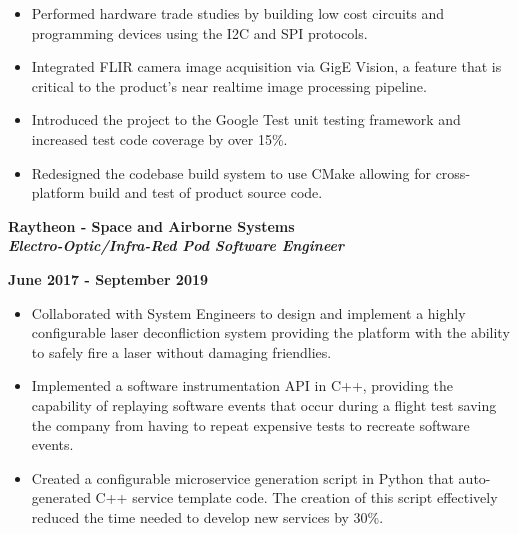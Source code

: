 \documentclass[10pt,letterpaper]{article}
\begin{document}
\begin{itemize}[noitemsep,topsep=0pt]
    \setlength\itemsep{0.1em}
    \item Performed hardware trade studies by building low cost circuits
          and programming devices using the I2C and SPI protocols.
    \item Integrated FLIR camera image acquisition via GigE Vision, a feature
          that is  critical to the product's near realtime image processing
          pipeline.
    \item Introduced the project to the Google Test unit testing framework and
          increased test code coverage by over 15\%.
    \item Redesigned the codebase build system to use CMake allowing for
          cross-platform build and test of product source code.
\end{itemize}

\medskip

\begin{minipage}[t]{0.53\textwidth}
    \begin{flushleft}
        \textbf{Raytheon - Space and Airborne Systems}\\
        \textbf{\textit{Electro-Optic/Infra-Red Pod Software Engineer}}\\
    \end{flushleft}
\end{minipage}
\begin{minipage}[t]{0.44\textwidth}
    \begin{flushright}
        \textbf{June 2017 - September 2019}
    \end{flushright}
\end{minipage}

\begin{itemize}[noitemsep,topsep=0pt]
    \setlength\itemsep{0.1em}
    \item Collaborated with System Engineers to design and implement a highly
          configurable laser deconfliction system providing the platform with
          the ability to safely fire a laser without damaging friendlies.
    \item Implemented a software instrumentation API in C++, providing the
          capability of replaying software events that occur during a flight
          test saving the company from having to repeat expensive tests to
          recreate software events.
    \item Created a configurable microservice generation script in Python that
          auto-generated C++ service template code. The creation of this script
          effectively reduced the time needed to develop new services by 30\%.
\end{itemize}
\end{document}
